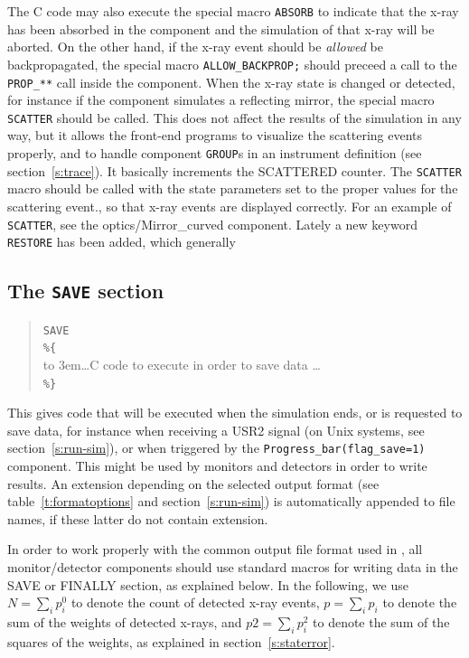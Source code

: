 The C code may also execute the special macro \texttt{ABSORB} to indicate
that the x-ray has been absorbed in the component and the simulation of
that x-ray will be aborted. On the other hand, if the x-ray event
should be \emph{allowed} be backpropagated, the special macro
\verb+ALLOW_BACKPROP;+ should preceed a call to the \verb+PROP_**+
call inside the component.
When the x-ray state is changed or detected, for
instance if the component simulates a reflecting mirror, the
special macro \texttt{SCATTER} should be called. This does not affect the
results of the simulation in any way, but it allows the front-end
programs to visualize the scattering events properly, and to handle
component \texttt{GROUP}s in an instrument definition (see
section~\ref{s:trace}). It basically increments the SCATTERED counter. The \texttt{SCATTER} macro should be called with
the state parameters set to the proper values for the scattering event., so that x-ray events are displayed correctly.
For an example of \texttt{SCATTER}, see the optics/Mirror\_curved
component. 
Lately a new keyword \texttt{RESTORE} has been added, which generally 

\subsection{The \texttt{SAVE} section}
\label{s:comp-save}

\begin{quote}
  \texttt{SAVE} \\
  \verb|%{| \\
  \hbox to 3em{}\ldots C code to execute in order to save data \ldots \\
  \verb|%}|
\end{quote}
This gives code that will be executed when the simulation ends, or is requested to save data, for instance when receiving a USR2 signal (on Unix systems, see section~\ref{s:run-sim}), or when triggered by the \texttt{Progress\_bar(flag\_save=1)} component.
This might be used by monitors and detectors in order to write results.
An extension depending on the selected output format (see table~\ref{t:formatoptions} and section~\ref{s:run-sim}) is automatically appended to file names, if these latter do not contain extension.

In order to work properly with the common output file format used in
\MCX, all monitor/detector components should use standard macros for
writing data in the SAVE or FINALLY section, as explained below. In the
following, we use $N = \sum_i p_i^0$ to denote the count of detected
x-ray events, $p = \sum_i p_i$ to denote the sum of the weights of
detected x-rays, and $\textit{p2} = \sum_i p_i^2$ to denote the sum of
the squares of the weights, as explained in section~\ref{s:staterror}.

